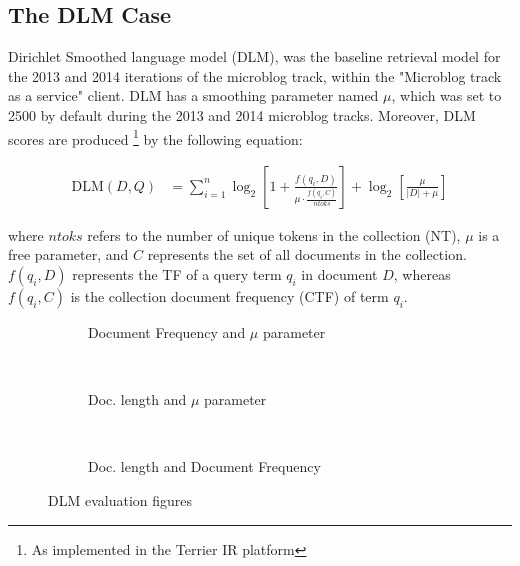 
\subsection{The DLM Case}
Dirichlet Smoothed language model (DLM), was the baseline retrieval model for the 2013 and 2014 iterations of the microblog track, within the "Microblog track as a service" client. DLM has a smoothing parameter named $\mu$, which was set to 2500 by default during the 2013 and 2014 microblog tracks. Moreover, DLM scores are produced \footnote{As implemented in the Terrier IR platform} by the following equation:

\begin{small}
\begin{align}
\label{dlmformula}
    \text{DLM}(D,Q) &= \sum_{i=1}^{n} \log_2 \left[ 1 + \frac{f(q_i, D)}{\mu \cdot \frac{ f(q_i, C) }{ ntoks }}\right] + \log_2 \left[\frac{\mu}{|D| + \mu}\right]
\end{align}
\label{dlmequation}
\end{small}

\noindent where $ntoks$ refers to the number of unique tokens in the collection (NT), $\mu$ is a free parameter, and $C$ represents the set of all documents in the collection. $f(q_i, D)$ represents the TF of a query term $q_i$ in document $D$, whereas $f(q_i, C)$ is the collection document frequency (CTF) of term $q_i$.

\begin{figure}
 		\begin{subfigure}[]{0.5\textwidth}
     	\caption{Document Frequency and $\mu$ parameter} 
    	
     	\label{dlmproofc2}
        \end{subfigure}
        ~
		\begin{subfigure}[]{0.5\textwidth}
           \caption{Doc. length and $\mu$ parameter}
           
           \label{dlmproofcc}          
        \end{subfigure}
        ~
		\begin{subfigure}[]{0.5\textwidth}
          \caption{Doc. length and Document Frequency}
          
          \label{dlmproof}          
        \end{subfigure}

        \caption{DLM evaluation figures}
\end{figure}

